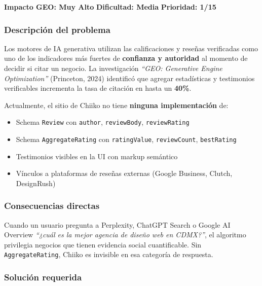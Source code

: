 \documentclass[12pt, a4paper]{article}
\begin{document}
\begin{criticalbox}
\textbf{Impacto GEO: Muy Alto} \quad \textbf{Dificultad: Media} \quad \textbf{Prioridad: 1/15}
\end{criticalbox}

\subsubsection{Descripción del problema}

Los motores de IA generativa utilizan las calificaciones y reseñas verificadas como uno de los indicadores más fuertes de \textbf{confianza y autoridad} al momento de decidir si citar un negocio. La investigación \textit{``GEO: Generative Engine Optimization''} (Princeton, 2024) identificó que agregar estadísticas y testimonios verificables incrementa la tasa de citación en hasta un \textbf{40\%}.

Actualmente, el sitio de Chiiko no tiene \textbf{ninguna implementación} de:
\begin{itemize}[itemsep=3pt]
  \item Schema \texttt{Review} con \texttt{author}, \texttt{reviewBody}, \texttt{reviewRating}
  \item Schema \texttt{AggregateRating} con \texttt{ratingValue}, \texttt{reviewCount}, \texttt{bestRating}
  \item Testimonios visibles en la UI con markup semántico
  \item Vínculos a plataformas de reseñas externas (Google Business, Clutch, DesignRush)
\end{itemize}

\subsubsection{Consecuencias directas}

Cuando un usuario pregunta a Perplexity, ChatGPT Search o Google AI Overview \textit{``¿cuál es la mejor agencia de diseño web en CDMX?''}, el algoritmo privilegia negocios que tienen evidencia social cuantificable. Sin \texttt{AggregateRating}, Chiiko es invisible en esa categoría de respuesta.

\subsubsection{Solución requerida}
\end{document}
